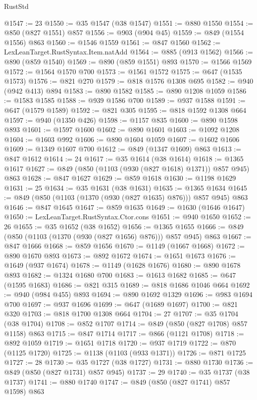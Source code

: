 \begin{lexlean}{RustStd}
\begin{coremodule}
@1547 := 23
@1550 := @35 @1547 (@38 @1547)
@1551 := @880 @1550
@1554 := @850 (@827 @1551) @857
@1556 := @903 (@904 @45)
@1559 := @849 (@1554 @1556) @863
@1560 := @1546 @1559
@1561 := @847 @1560
@1562 := LexLeanTarget.RustSyntax.Item.natAdd
@1564 := @885 (@913 @1562)
@1566 := @890 (@859 @1540)
@1569 := @890 (@859 @1551) @893
@1570 := @1566 @1569
@1572 := @1564 @1570 @700
@1573 := @1561 @1572
@1575 := @647 (@1535 @1573)
@1576 := @821 @270
@1579 := @818 @1576 @1308 @695
@1582 := @940 (@942 @413) @894
@1583 := @890 @1582
@1585 := @890 @1208 @1059
@1586 := @1583 @1585
@1588 := @939 @1586 @700
@1589 := @937 @1588
@1591 := @647 (@1579 @1589)
@1592 := @821 @305
@1595 := @818 @1592 @1308 @664
@1597 := @940 (@1350 @426)
@1598 := @1157 @835
@1600 := @890 @1598 @893
@1601 := @1597 @1600
@1602 := @890 @1601
@1603 := @1092 @1208
@1604 := @1603 @992
@1606 := @890 @1604 @1059
@1607 := @1602 @1606
@1609 := @1349 @1607 @700
@1612 := @849 (@1347 @1609) @863
@1613 := @847 @1612
@1614 := 24
@1617 := @35 @1614 (@38 @1614)
@1618 := @1365 @1617
@1627 := @849 (@850 (@1103 (@930 (@827 @1618) @1371)) @857 @945) @863
@1628 := @847 @1627
@1629 := @859 @1618
@1630 := @1198 @1629
@1631 := 25
@1634 := @35 @1631 (@38 @1631)
@1635 := @1365 @1634
@1645 := @849 (@850 (@1103 (@1370 (@930 (@827 @1635) @876))) @857 @945) @863
@1646 := @847 @1645
@1647 := @859 @1635
@1649 := @1630 (@1646 @1647)
@1650 := LexLeanTarget.RustSyntax.Ctor.cons
@1651 := @940 @1650
@1652 := 26
@1655 := @35 @1652 (@38 @1652)
@1656 := @1365 @1655
@1666 := @849 (@850 (@1103 (@1370 (@930 (@827 @1656) @876))) @857 @945) @863
@1667 := @847 @1666
@1668 := @859 @1656
@1670 := @1149 (@1667 @1668)
@1672 := @890 @1670 @893
@1673 := @892 @1672
@1674 := @1651 @1673
@1676 := @1649 (@937 @1674)
@1678 := @1149 (@1628 @1676)
@1680 := @890 @1678 @893
@1682 := @1324 @1680 @700
@1683 := @1613 @1682
@1685 := @647 (@1595 @1683)
@1686 := @821 @315
@1689 := @818 @1686 @1046 @664
@1692 := @940 (@984 @455) @893
@1694 := @890 @1692 @1329
@1696 := @983 @1694 @700
@1697 := @937 @1696
@1699 := @647 (@1689 @1697)
@1700 := @821 @320
@1703 := @818 @1700 @1308 @664
@1704 := 27
@1707 := @35 @1704 (@38 @1704)
@1708 := @852 @1707
@1714 := @849 (@850 (@827 @1708) @857 @1158) @863
@1715 := @847 @1714
@1717 := @866 (@1121 @1708)
@1718 := @892 @1059
@1719 := @1651 @1718
@1720 := @937 @1719
@1722 := @870 (@1125 @1720)
@1725 := @1138 (@1103 (@933 @1371))
@1726 := @871 @1725
@1727 := 28
@1730 := @35 @1727 (@38 @1727)
@1731 := @880 @1730
@1736 := @849 (@850 (@827 @1731) @857 @945)
@1737 := 29
@1740 := @35 @1737 (@38 @1737)
@1741 := @880 @1740
@1747 := @849 (@850 (@827 @1741) @857 @1598) @863

\end{coremodule}
\end{lexlean}
